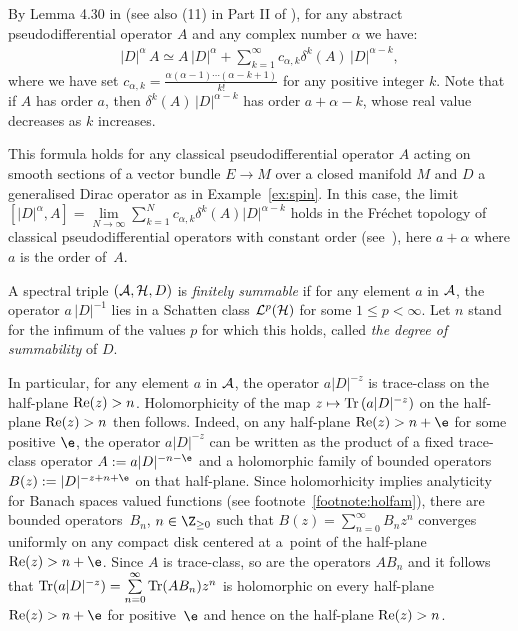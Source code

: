 By Lemma
4.30 in \cite{Hig} (see also (11) in Part II of \cite{CoMo}), for any abstract
pseudodif\/ferential operator $A$ and any complex number $\alpha$  we have:
 \begin{gather} \label{eq:commDalpha} \vert D\vert^\alpha\,  A\simeq    A\,
 \vert D\vert^\alpha+  \sum_{k=1}^\infty c_{\alpha,k}
\delta^k(A) \, \vert D\vert^{\alpha -k},
\end{gather}
 where we have set $c_{ \alpha, k}=
 \frac{\alpha(\alpha-1)\cdots (\alpha-k+1)}{k!}$ for any positive integer $k$. Note that if $A$ has order
$a$,
 then  $\delta^k(A)\, \vert D\vert^{\alpha-k}$ has order $a+\alpha-k$,   whose
 real value  decreases as $k$ increases.
\begin{example}
This formula holds  for any classical pseudodif\/ferential
operator $A$ acting on smooth sections of a vector bundle $E\to M$ over a
closed manifold $M$  and $D$ a generalised Dirac operator as in Example~\ref{ex:spin}. In this case,   the
limit $[\vert D\vert^\alpha, A]= \lim\limits_{N\to \infty}  \sum\limits_{k=1}^N c_{\alpha,k}
\delta^k(A)   \vert D\vert^{\alpha -k}$  holds in the Fr\'echet topology  of
classical pseudodif\/ferential operators with constant order (see~\cite{KV}),
 here $a+\alpha$ where $a$ is the order of~$A$.
\end{example}

\begin{definition} A  spectral triple $\left({\cal A}, {\cal H}, D\right)$ is   {\it
    finitely summable}   if  for any element $ a$ in
${\cal A}$, the operator $a\, \vert D\vert^{-1}$ lies in  a  Schatten class ${\cal
  L}^p({\cal H})$ for some $1\leq p<\infty$. Let $n$ stand for the inf\/imum of
the values  $p$ for which this holds, called {\it the degree of summability}
of $D$.
\end{definition}

\begin{remark}  In particular, for any element $ a$ in
${\cal A}$, the operator $a
    \vert D\vert^{-z}$ is trace-class  on the half-plane ${\rm
    Re}(z)>n $. Holomorphicity of the map $z\mapsto {\rm Tr}\left(a
    \vert D\vert^{-z}\right)$ on the half-plane ${\rm
    Re}(z)>n $ then follows. Indeed,  on any half-plane  ${\rm    Re}(z)>n+\e$ for some positive $\e$, the operator   $a   \vert D\vert^{-z}$  can be written  as  the product of a f\/ixed trace-class operator $A:= a \vert D\vert^{-n-\e}$ and a holomorphic family of bounded operators $B(z):=\vert D\vert^{-z+n+\e}$  on that
half-plane.   Since  holomorhicity implies analyticity for  Banach spaces valued functions (see  footnote~\ref{footnote:holfam}), there are bounded operators~$B_n$, $n\in \Z_{\geq 0}$ such that
$B(z)=\sum\limits_{n=0}^\infty B_n z^n$ converges uniformly on any compact disk centered at a~point of the half-plane  ${\rm
    Re}(z)>n+\e$.  Since $A$ is trace-class, so are the operators $AB_n$ and it  follows that ${\rm Tr}(a   \vert D\vert^{-z})= \sum\limits_{n=0}^\infty{\rm Tr}( A  B_n)z^n$ is holomorphic on every half-plane  ${\rm
    Re}(z)>n+\e$ for  positive~$\e$
 and hence on the half-plane  ${\rm
    Re}(z)>n$.
\end{remark}

